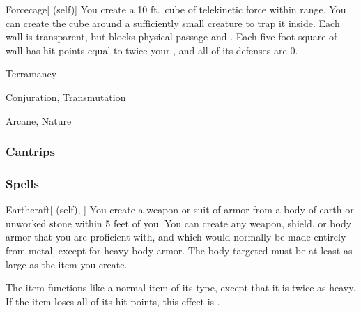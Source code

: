 \lowercase{\hypertarget{spell:Forcecage}{}}\label{spell:Forcecage}
\begin{attuneability}[\nth{7}]{\hypertarget{spell:Forcecage}{Forcecage}}[ (self)]
You create a 10 ft.\ cube of telekinetic force within \rngmed range.
You can create the cube around a sufficiently small creature to trap it inside.
Each wall is transparent, but blocks physical passage and .
Each five-foot square of wall has hit points equal to twice your , and all of its defenses are 0.
\end{attuneability}
\vspace{0.25em}


\newpage
\begin{spellsection}{Terramancy}

\begin{spellheader}
\end{spellheader}


 Conjuration, Transmutation

 Arcane, Nature

\subsubsection{Cantrips}


\end{spellsection}


\subsubsection{Spells}


\lowercase{\hypertarget{spell:Earthcraft}{}}\label{spell:Earthcraft}
\begin{attuneability}[\nth{1}]{\hypertarget{spell:Earthcraft}{Earthcraft}}[ (self), ]
You create a weapon or suit of armor from a body of earth or unworked stone within 5 feet of you.
You can create any weapon, shield, or body armor that you are proficient with, and which would normally be made entirely from metal, except for heavy body armor.
The body targeted must be at least as large as the item you create.

The item functions like a normal item of its type, except that it is twice as heavy.
If the item loses all of its hit points, this effect is .
\end{attuneability}
\vspace{0.25em}



